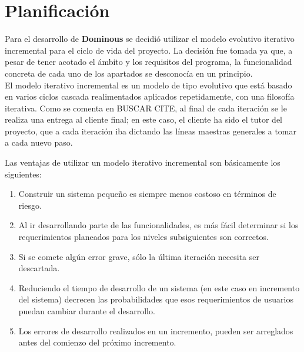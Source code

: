 

\section{Planificación}

Para el desarrollo de \textbf{Dominous} se decidió utilizar el modelo evolutivo iterativo incremental para el ciclo de
vida del proyecto. La decisión fue tomada ya que, a pesar de tener acotado el ámbito y los requisitos del programa,
la funcionalidad concreta de cada uno de los apartados se desconocía en un principio.\\

El modelo iterativo incremental es un modelo de tipo evolutivo que está basado en varios ciclos cascada realimentados aplicados
repetidamente, con una filosofía iterativa. Como se comenta en BUSCAR CITE, al final de cada iteración se le
realiza una entrega al cliente final; en este caso, el cliente ha sido el tutor del proyecto, que a cada iteración iba
dictando las líneas maestras generales a tomar a cada nuevo paso.

Las ventajas de utilizar un modelo iterativo incremental son básicamente los siguientes:
\begin{enumerate}
    \item Construir un sistema pequeño es siempre menos costoso en términos de riesgo.
    \item Al ir desarrollando parte de las funcionalidades, es más fácil determinar si los requerimientos
            planeados para los niveles subsiguientes son correctos.
    \item Si se comete algún error grave, sólo la última iteración necesita ser descartada.
    \item Reduciendo el tiempo de desarrollo de un sistema (en este caso en incremento del sistema) decrecen las
            probabilidades que esos requerimientos de usuarios puedan cambiar durante el desarrollo.
    \item Los errores de desarrollo realizados en un incremento, pueden ser arreglados antes del comienzo del próximo incremento.
\end{enumerate}

